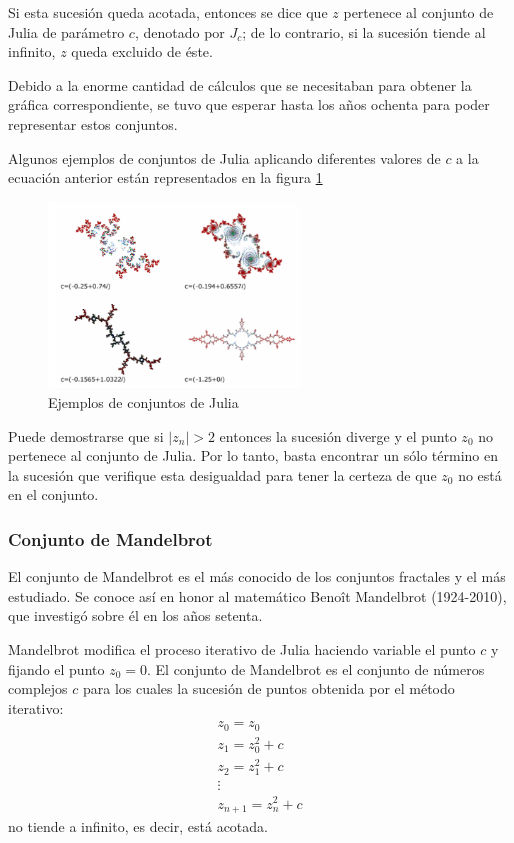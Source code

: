 Si esta sucesión queda acotada, entonces se dice que $z$ pertenece al conjunto de Julia de parámetro $c$, denotado por $J_c$; de lo contrario, si la sucesión tiende al infinito, $z$ queda excluido de éste.

Debido a la enorme cantidad de cálculos que se necesitaban para obtener la gráfica correspondiente, se tuvo que esperar hasta los años ochenta para poder representar estos conjuntos.

Algunos ejemplos de conjuntos de Julia aplicando diferentes valores de $c$ a la ecuación anterior están representados en la figura \ref{fig:Julia}

\begin{figure}[hbtp]
\centering
\includegraphics[width = 0.6\textwidth]{img/Julia_sets.png}
\caption{Ejemplos de conjuntos de Julia}
\label{fig:Julia}
\end{figure}

Puede demostrarse que si $|z_n| > 2$ entonces la sucesión diverge y el punto $z_0$ no pertenece al conjunto de Julia. Por lo tanto, basta encontrar un sólo término en la sucesión que verifique esta desigualdad para tener la certeza de que $z_0$ no está en el conjunto.

\subsubsection{Conjunto de Mandelbrot}
\begin{definition}
El conjunto de Mandelbrot es el más conocido de los conjuntos fractales y el más estudiado. Se conoce así en honor al matemático Benoît Mandelbrot (1924-2010), que investigó sobre él en los años setenta.

Mandelbrot modifica el proceso iterativo de Julia haciendo variable el punto $c$ y fijando el punto $z_0=0$. El conjunto de Mandelbrot es el conjunto de números complejos $c$ para los cuales la sucesión de puntos obtenida por el método iterativo:
\[\begin{array}{l}
z_0=z_0\\
z_1=z_0^2+c \\
z_2 = z_1^2 + c \\
\vdots \\
z_{n+1} = z_n^2+c
\end{array}\]
no tiende a infinito, es decir, está acotada.
\end{definition}


